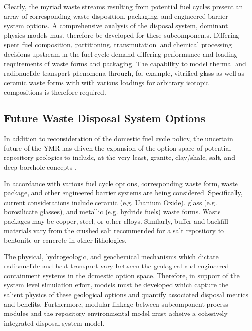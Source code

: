 Clearly, the myriad waste streams resulting from potential fuel cycles 
present an array of corresponding waste disposition, packaging, and 
engineered barrier system options. A comprehensive analysis of the 
disposal system, dominant physics models must therefore be developed 
for these subcomponents.  Differing spent fuel composition, 
partitioning, transmutation, and chemical processing decisions 
upstream in the fuel cycle demand differing performance and loading 
requirements of waste forms and packaging. The capability to model 
thermal and radionuclide transport phenomena through, for example, 
vitrified glass as well as ceramic waste forms with with various 
loadings for arbitrary isotopic compositions is therefore required.  

\subsection{Future Waste Disposal System Options}

In addition to reconsideration of the domestic fuel cycle policy, the 
uncertain future of the \gls{YMR} has driven the expansion of the option 
space of potential repository geologies to include, at the very least, 
granite, clay/shale, salt, and deep borehole concepts \cite{nutt_used_2010}. 

In accordance with various fuel cycle options, corresponding waste 
form, waste package, and other engineered barrier systems are being 
considered. Specifically, current considerations include ceramic (e.g.  
Uranium Oxide), glass (e.g.  borosilicate glasses), and metallic (e.g.  
hydride fuels) waste forms. Waste packages may be copper, steel, or 
other alloys. Similarly, buffer and backfill materials vary from the 
crushed salt recommended for a salt repository to bentonite or concrete 
in other lithologies. %

The physical, hydrogeologic, and geochemical mechanisms which dictate 
radionuclide and heat transport vary between the geological and engineered 
containment systems in the domestic option space.  Therefore, in 
support of the system level simulation effort, models must be 
developed which capture the salient physics of these geological 
options and quantify associated disposal metrics and benefits.  
Furthermore, modular linkage between subcomponent process modules and 
the repository environmental model must acheive a cohesively 
integrated disposal system model. 


